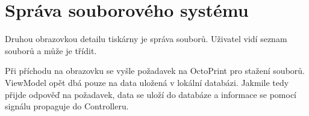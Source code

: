 \section{Správa souborového systému}

Druhou obrazovkou detailu tiskárny je správa souborů.
Uživatel vidí seznam souborů a může je třídit.

Při příchodu na obrazovku se vyšle požadavek na OctoPrint pro stažení souborů.
ViewModel opět dbá pouze na data uložená v lokální databázi.
Jakmile tedy přijde odpověď na požadavek, data se uloží do databáze a informace se pomocí signálu propaguje do Controlleru.
